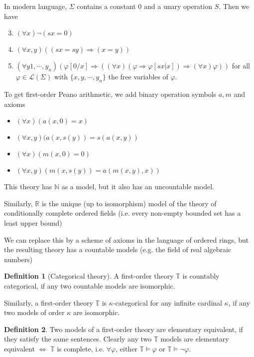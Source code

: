 \documentclass[a4paper]{article}
\theoremstyle{definition}
\newtheorem*{defi}{Definition}
\newcommand{\N}{\mathbb{N}}
\newcommand{\R}{\mathbb{R}}
\newcommand{\T}{\mathbb{T}}
\newcommand{\La}{\mathcal{L}}
\begin{document}
In modern language, $\Sigma$ contains a constant 0 and a unary operation $S$. Then we have
\begin{enumerate}
\setcounter{enumi}{2}
\item $(\forall x)\neg (sx = 0)$
\item $(\forall x, y)((sx = sy)\Rightarrow (x = y))$
\item $(\forall y1, \cdots, y_n) (\varphi[0/x] \Rightarrow ((\forall x)(\varphi \Rightarrow \varphi[sx|x])\Rightarrow (\forall x)\varphi))$ for all $\varphi \in \La(\Sigma)$ with $\{x, y, \cdots, y_n\}$ the free variables of $\varphi$.
\end{enumerate}

To get first-order Peano arithmetic, we add binary operation symbols $a, m$ and axioms 
\begin{itemize}
\item $(\forall x)(a(x,0) = x)$
\item $(\forall x, y)(a(x,s(y)) = s(a(x,y))$
\item $(\forall x)(m(x,0) = 0)$
\item $(\forall x, y)(m(x,s(y)) = a(m(x,y),x))$
\end{itemize}
This theory has $\N$ as a model, but it also has an uncountable model.

Similarly, $\R$ is the unique (up to isomorphism) model of the theory of conditionally complete ordered fields (i.e. every non-empty bounded set has a least upper bound)

We can replace this by a scheme of axioms in the language of ordered rings, but the resulting theory has a countable models (e.g. the field of real algebraic numbers)

\begin{defi}[Categorical theory]
  A first-order theory $\T$ is countably categorical, if any two countable models are isomorphic.

  Similarly, a first-order theory $\T$ is $\kappa$-categorical for any infinite cardinal $\kappa$, if any two models of order $\kappa$ are isomorphic.
\end{defi}

\begin{defi}
  Two models of a first-order theory are elementary equivalent, if they satisfy the same sentences. Clearly any two $\T$ models are elementary equivalent $\Leftrightarrow$ $\T$ is complete, i.e. $\forall \varphi$, either $\T\models \varphi$ or $\T \models \neg \varphi$.
\end{defi}
\end{document}
